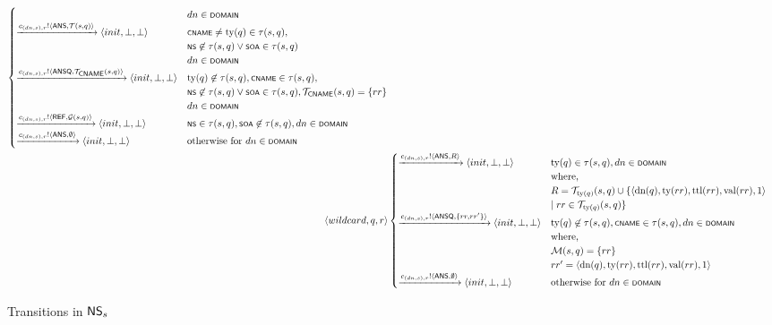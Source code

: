 \documentclass[english,acmsmall, screen, nonacm]{acmart}
\theoremstyle{plain}
\theoremstyle{definition}
\theoremstyle{remark}
\begin{document}
\begin{figure}[h]
\begin{gather}
\begin{align*}
\begin{cases}
				& dn\in\scrsf{domain}\\
				\xrightarrow{c_{(dn,s),r}!\tup{\scrsf{ans},{\cal T}(s,q)}}\tup{init,\bot,\bot} & \scrsf{cname}\neq\text{ty}(q)\in\tau(s,q),\\
				& \scrsf{ns}\not\in\tau(s,q)\vee\scrsf{soa}\in\tau(s,q)\\
				& dn\in\scrsf{domain}\\
				\xrightarrow{c_{(dn,s),r}!\tup{\scrsf{ansq},{\cal T}_{\scrsf{cname}}(s,q)}}\tup{init,\bot,\bot} & \text{ty}(q)\not\in\tau(s,q),\scrsf{cname}\in\tau(s,q),\\
				& \scrsf{ns}\not\in\tau(s,q)\vee\scrsf{soa}\in\tau(s,q),{\cal T}_{\scrsf{cname}}(s,q)=\{rr\}\\
				& dn\in\scrsf{domain}\\
				\xrightarrow{c_{(dn,s),r}!\tup{\scrsf{ref},{\cal G}(s,q)}}\tup{init,\bot,\bot} & \scrsf{ns}\in\tau(s,q),\scrsf{soa}\not\in\tau(s,q),dn\in\scrsf{domain}\\
				\xrightarrow{c_{(dn,s),r}!\tup{\scrsf{ans},\emptyset}}\tup{init,\bot,\bot} & \text{otherwise for }dn\in\scrsf{domain}
			\end{cases}\\
			\tup{wildcard,q,r} & \begin{cases}
				\xrightarrow{c_{(dn,s),r}!\tup{\scrsf{ans},R}}\tup{init,\bot,\bot} & \text{ty}(q)\in\tau(s,q),dn\in\scrsf{domain}\\
				& \text{where, }\\
				& R={\cal T}_{\text{ty}(q)}(s,q)\cup\{\tup{\text{dn}(q),\text{ty}(rr),\text{ttl}(rr),\text{val}(rr),1}\\
				& \mid rr\in{\cal T}_{\text{ty}(q)}(s,q)\}\\
				\xrightarrow{c_{(dn,s),r}!\tup{\scrsf{ansq},\{rr,rr'\}}}\tup{init,\bot,\bot} & \text{ty}(q)\not\in\tau(s,q),\scrsf{cname}\in\tau(s,q),dn\in\scrsf{domain}\\
				& \text{where, }\\
				& {\cal M}(s,q)=\{rr\}\\
				& rr'=\tup{\text{dn}(q),\text{ty}(rr),\text{ttl}(rr),\text{val}(rr),1}\\
				\xrightarrow{c_{(dn,s),r}!\tup{\scrsf{ans},\emptyset}}\tup{init,\bot,\bot} & \text{otherwise for }dn\in\scrsf{domain}
			\end{cases}
		\end{align*}
	\end{gather}
	
	\caption{\label{fig:ns-transitions-old}Transitions in $\mathsf{NS}_{s}$}
\end{figure}
\end{document}
